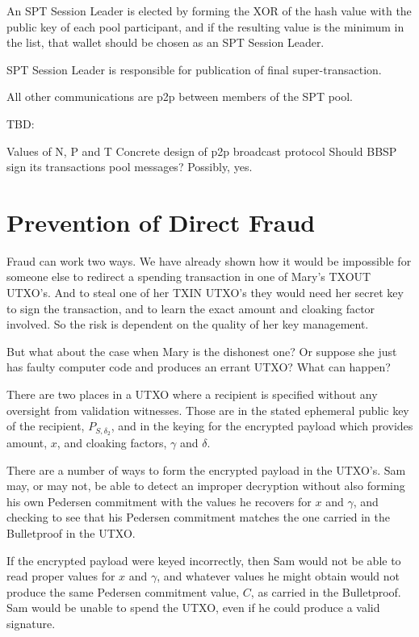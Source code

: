\documentclass[a4paper, 10pt, conference]{ieeeconf}
\begin{document}
An SPT Session Leader is elected by forming the XOR of the hash value with the public key of each pool participant, and if the resulting value is the minimum in the list, that wallet should be chosen as an SPT Session Leader.

SPT Session Leader is responsible for publication of final super-transaction.

All other communications are p2p between members of the SPT pool.

TBD:

Values of N, P and T
Concrete design of p2p broadcast protocol
Should BBSP sign its transactions pool messages? Possibly, yes.

\section{Prevention of Direct Fraud}
Fraud can work two ways. We have already shown how it would be impossible for someone else to redirect a spending transaction in one of Mary's TXOUT UTXO's. And to steal one of her TXIN UTXO's they would need her secret key to sign the transaction, and to learn the exact amount and cloaking factor involved. So the risk is dependent on the quality of her key management.

But what about the case when Mary is the dishonest one? Or suppose she just has faulty computer code and produces an errant UTXO? What can happen?

There are two places in a UTXO where a recipient is specified without any oversight from validation witnesses. Those are in the stated ephemeral public key of the recipient, $P_{S, \delta_2}$, and in the keying for the encrypted payload which provides amount, $x$, and cloaking factors, $\gamma$ and $\delta$. 

There are a number of ways to form the encrypted payload in the UTXO's. Sam may, or may not, be able to detect an improper decryption without also forming his own Pedersen commitment with the values he recovers for $x$ and $\gamma$, and checking to see that his Pedersen commitment matches the one carried in the Bulletproof in the UTXO.

If the encrypted payload were keyed incorrectly, then Sam would not be able to read proper values for $x$ and $\gamma$, and whatever values he might obtain would not produce the same Pedersen commitment value, $C$, as carried in the Bulletproof. Sam would be unable to spend the UTXO, even if he could produce a valid signature.
\end{document}
